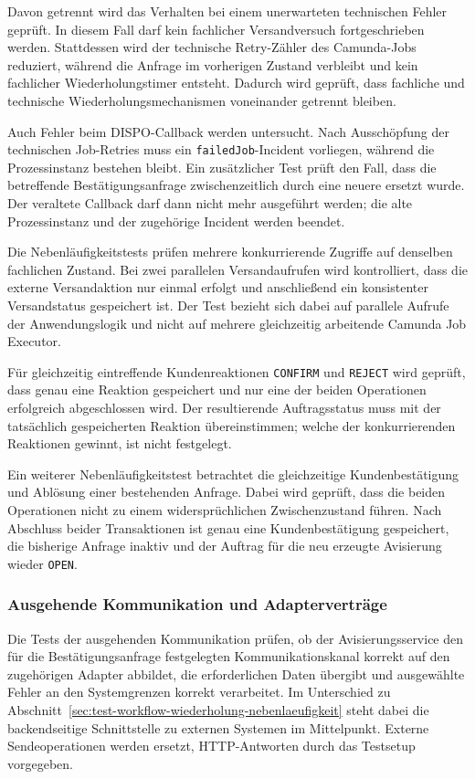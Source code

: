 \documentclass[
  12pt,
  a4paper,
  oneside
]{article}
\begin{document}
Davon getrennt wird das Verhalten bei einem unerwarteten technischen Fehler
geprüft. In diesem Fall darf kein fachlicher Versandversuch fortgeschrieben
werden. Stattdessen wird der technische Retry-Zähler des Camunda-Jobs reduziert,
während die Anfrage im vorherigen Zustand verbleibt und kein fachlicher
Wiederholungstimer entsteht. Dadurch wird geprüft, dass fachliche und technische
Wiederholungsmechanismen voneinander getrennt bleiben.

Auch Fehler beim DISPO-Callback werden untersucht. Nach Ausschöpfung der
technischen Job-Retries muss ein \texttt{failedJob}-Incident vorliegen, während
die Prozessinstanz bestehen bleibt. Ein zusätzlicher Test prüft den Fall, dass
die betreffende Bestätigungsanfrage zwischenzeitlich durch eine neuere
ersetzt wurde. Der veraltete Callback darf dann nicht mehr ausgeführt werden;
die alte Prozessinstanz und der zugehörige Incident werden beendet.

Die Nebenläufigkeitstests prüfen mehrere konkurrierende Zugriffe auf denselben
fachlichen Zustand. Bei zwei parallelen Versandaufrufen wird kontrolliert, dass
die externe Versandaktion nur einmal erfolgt und anschließend ein konsistenter
Versandstatus gespeichert ist. Der Test bezieht sich dabei auf parallele
Aufrufe der Anwendungslogik und nicht auf mehrere gleichzeitig arbeitende
Camunda Job Executor.

Für gleichzeitig eintreffende Kundenreaktionen \texttt{CONFIRM} und
\texttt{REJECT} wird geprüft, dass genau eine Reaktion gespeichert und nur eine
der beiden Operationen erfolgreich abgeschlossen wird. Der resultierende
Auftragsstatus muss mit der tatsächlich gespeicherten Reaktion übereinstimmen;
welche der konkurrierenden Reaktionen gewinnt, ist nicht festgelegt.

Ein weiterer Nebenläufigkeitstest betrachtet die gleichzeitige
Kundenbestätigung und Ablösung einer bestehenden Anfrage. Dabei wird geprüft,
dass die beiden Operationen nicht zu einem widersprüchlichen Zwischenzustand
führen. Nach Abschluss beider Transaktionen ist genau eine Kundenbestätigung
gespeichert, die bisherige Anfrage inaktiv und der Auftrag für die neu erzeugte
Avisierung wieder \texttt{OPEN}.

\subsubsection{Ausgehende Kommunikation und Adapterverträge}
\label{sec:test-kommunikation-adaptervertraege}

Die Tests der ausgehenden Kommunikation prüfen, ob der Avisierungsservice den
für die Bestätigungsanfrage festgelegten Kommunikationskanal korrekt auf den
zugehörigen Adapter abbildet, die erforderlichen Daten übergibt und ausgewählte
Fehler an den Systemgrenzen korrekt verarbeitet. Im Unterschied zu
Abschnitt~\ref{sec:test-workflow-wiederholung-nebenlaeufigkeit} steht dabei die
backendseitige Schnittstelle zu externen Systemen im Mittelpunkt. Externe
Sendeoperationen werden ersetzt, HTTP-Antworten durch das Testsetup vorgegeben.
\end{document}
